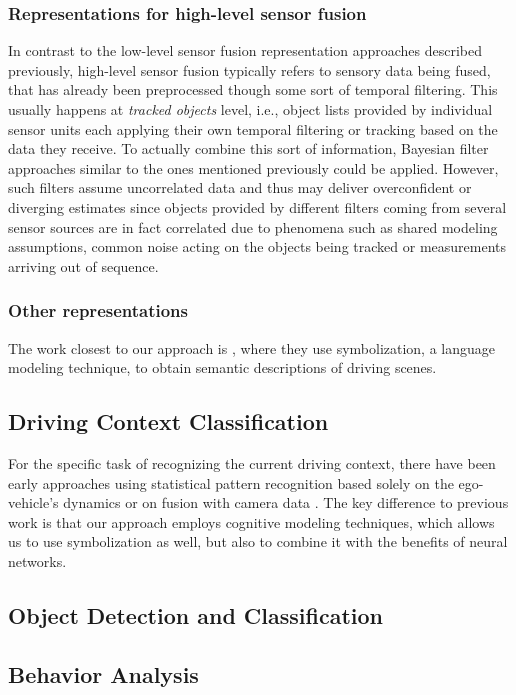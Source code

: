 \subsubsection{Representations for high-level sensor fusion}
In contrast to the low-level sensor fusion representation approaches described previously, high-level sensor fusion typically refers to sensory data being fused, that has already been preprocessed though some sort of temporal filtering.
This usually happens at \emph{tracked objects} level, i.e., object lists provided by individual sensor units each applying their own temporal filtering or tracking based on the data they receive.
To actually combine this sort of information, Bayesian filter approaches similar to the ones mentioned previously could be applied. 
However, such filters assume uncorrelated data and thus may deliver overconfident or diverging estimates since objects provided by different filters coming from several sensor sources are in fact correlated due to phenomena such as shared modeling assumptions, common noise acting on the objects being tracked or measurements arriving out of sequence.

\subsubsection{Other representations}
The work closest to our approach is \cite{Yamazaki2016}, where they use symbolization, a language modeling technique, to obtain semantic descriptions of driving scenes.

\subsection{Driving Context Classification}
For the specific task of recognizing the current driving context, there have been early approaches using statistical pattern recognition based solely on the ego-vehicle's dynamics \cite{Engstrom2001} or on fusion with camera data \cite{Hauptmann1996}.
The key difference to previous work is that our approach employs cognitive modeling techniques, which allows us to use symbolization as well, but also to combine it with the benefits of neural networks.

\subsection{Object Detection and Classification}
\label{subsec:obj_detect}
\subsection{Behavior Analysis}
\label{subsec:behav_analysis}

